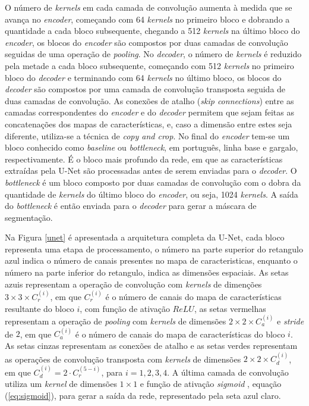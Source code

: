 
O número de \textit{kernels} em cada camada de convolução aumenta à medida que se avança no \textit{encoder}, começando com 64 \textit{kernels} no primeiro bloco e dobrando a quantidade a cada bloco subsequente, chegando a 512 \textit{kernels} na último bloco do \textit{encoder}, os blocos do \textit{encoder} são compostos por duas camadas de convolução seguidas de uma operação de \textit{pooling}. No \textit{decoder}, o número de \textit{kernels} é reduzido pela metade a cada bloco subsequente, começando com 512 \textit{kernels} no primeiro bloco do \textit{decoder} e terminando com 64 \textit{kernels} no último bloco, os blocos do \textit{decoder} são compostos por uma camada de convolução transposta seguida de duas camadas de convolução. As conexões de atalho (\textit{skip connections}) entre as camadas correspondentes do \textit{encoder} e do \textit{decoder} permitem que sejam feitas as concatenações dos mapas de características, e, caso a dimensão entre estes seja diferente, utiliza-se a técnica de \textit{copy and crop}. No final do \textit{encoder} tem-se um bloco conhecido como \textit{baseline} ou \textit{bottleneck}, em português, linha base e gargalo, respectivamente. É o bloco mais profundo da rede, em que as características extraídas pela U-Net são processadas antes de serem enviadas para o \textit{decoder}. O \textit{bottleneck} é um bloco composto por duas camadas de convolução com o dobra da quantidade de \textit{kernels} do último bloco do \textit{encoder}, ou seja, 1024 \textit{kernels}. A saída do \textit{bottleneck} é então enviada para o \textit{decoder} para gerar a máscara de segmentação.

Na Figura \ref{unet} é apresentada a arquitetura completa da U-Net, cada bloco representa uma etapa de processamento, o número na parte superior do retangulo azul indica o número de canais presentes no mapa de caracteristicas, enquanto o número na parte inferior do retangulo, indica as dimensões espaciais. As setas azuis representam a operação de convolução com \textit{kernels} de dimenções $3\times 3 \times C_r^{(i)}$, em que $C_r^{(i)}$ é o número de canais do mapa de características resultante do bloco $i$, com função de ativação $ReLU$, as setas vermelhas representam a operação de \textit{pooling} com \textit{kernels} de dimensões $2\times 2 \times C_a^{(i)}$ e \textit{stride} de $2$, em que $C_a^{(i)}$ é o número de canais do mapa de características do bloco $i$. As setas cinzas representam as conexões de atalho e as setas verdes representam as operações de convolução transposta com \textit{kernels} de dimensões $2\times 2 \times C_d^{(i)}$, em que $C_d^{(i)} = 2 \cdot C_r^{(5 - i)}$, para $i = 1, 2, 3, 4$. A última camada de convolução utiliza um \textit{kernel} de dimensões $1\times 1$ e função de ativação \textit{sigmoid }, equação (\ref{eq:sigmoid}), para gerar a saída da rede, representado pela seta azul claro.

